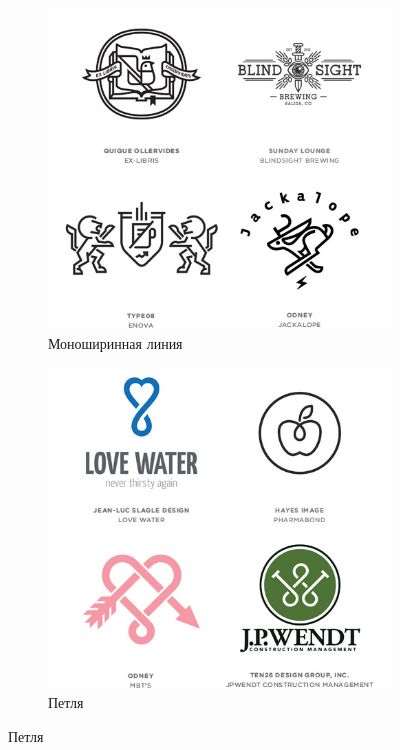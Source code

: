 \begin{figure}[h!]
  \vfill

  \centering
  \begin{subfigure}{.45\textwidth}
    \centering
    \includegraphics[width=\linewidth]{images/supplement/logolounge/2013/Monoshirinnaya-liniya}
    \caption[]{Моноширинная линия}
    \label{fig:logolounge:2013:monoshirinnaya-liniya}
  \end{subfigure}
  \hfill
  \centering
  \begin{subfigure}{.45\textwidth}
    \centering
    \includegraphics[width=\linewidth]{images/supplement/logolounge/2013/Petlya}
    \caption[]{Петля}
    \label{fig:logolounge:2013:petlya}
  \end{subfigure}
\end{figure}

